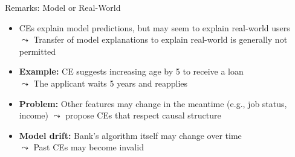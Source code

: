 \documentclass[10pt,compress,t,notes=noshow, xcolor=table]{beamer}
\begin{document}
\begin{frame}{Remarks: Model or Real-World}

	\begin{itemize}
	\item CEs explain model predictions, but may seem to explain real-world users\\
$\leadsto$ Transfer of model explanations to explain real-world is generally not permitted
  \item \textbf{Example:} CE suggests increasing age by 5 to receive a loan\\
  $\leadsto$ The applicant waits 5 years and reapplies
  \pause
  \item \textbf{Problem:} Other features may change in the meantime (e.g., job status, income)  
  $\leadsto$  propose CEs that respect causal structure
  \item \textbf{Model drift:} Bank's algorithm itself may change over time\\
  $\leadsto$ Past CEs may become invalid
	\end{itemize}
\end{frame}



\endlecture
\end{document}
